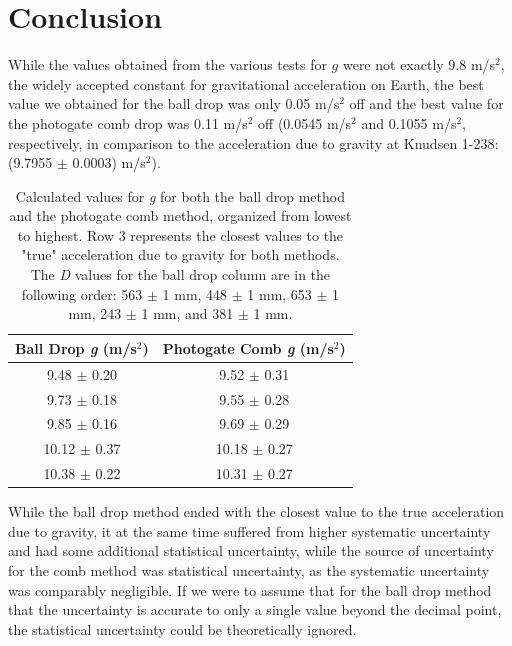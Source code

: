\documentclass[titlepage]{article}
\begin{document}
\pagebreak

\section{Conclusion}
While the values obtained from the various tests for $g$ were not exactly 9.8 m/s$^2$, the widely accepted constant for gravitational acceleration on Earth, the best value we obtained for the ball drop was only 0.05 m/s$^2$ off and the best value for the photogate comb drop was 0.11 m/s$^2$ off (0.0545 m/s$^2$ and 0.1055 m/s$^2$, respectively, in comparison to the acceleration due to gravity at Knudsen 1-238: (9.7955 $\pm$ 0.0003) m/s$^2$).

\begin{table}[!htbp]
\renewcommand{\arraystretch}{1.3}
\centering
\begin{tabular}{c|c}
    \hline
    \hline
    Ball Drop \textit{g} (m/s$^2$) & Photogate Comb \textit{g} (m/s$^2$)\\
    \hline
    \hline

    9.48 $\pm$ 0.20 &  9.52 $\pm$ 0.31\\
    \hline

    9.73 $\pm$ 0.18 & 9.55 $\pm$ 0.28 \\
    \hline

    9.85 $\pm$ 0.16 &  9.69 $\pm$ 0.29 \\
    \hline

    10.12 $\pm$ 0.37 & 10.18 $\pm$ 0.27 \\ 
    \hline

    10.38 $\pm$ 0.22 & 10.31 $\pm$ 0.27 \\
    \hline
\end{tabular}
\caption{Calculated values for \textit{g} for both the ball drop method and the photogate comb method, organized from lowest to highest. Row 3 represents the closest values to the "true" acceleration due to gravity for both methods. The \textit{D} values for the ball drop column are in the following order: 563 $\pm$ 1 mm, 448 $\pm$ 1 mm, 653 $\pm$ 1 mm, 243 $\pm$ 1 mm, and 381 $\pm$ 1 mm. }
\end{table}

While the ball drop method ended with the closest value to the true acceleration due to gravity, it at the same time suffered from higher systematic uncertainty and had some additional statistical uncertainty, while the source of uncertainty for the comb method was statistical uncertainty, as the systematic uncertainty was comparably negligible. If we were to assume that for the ball drop method that the uncertainty is accurate to only a single value beyond the decimal point, the statistical uncertainty could be theoretically ignored.
\end{document}
